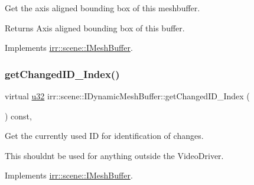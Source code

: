 Get the axis aligned bounding box of this meshbuffer. 

\begin{DoxyReturn}{Returns}
Axis aligned bounding box of this buffer. 
\end{DoxyReturn}


Implements \hyperlink{classirr_1_1scene_1_1IMeshBuffer_ac53fe1096756a40f25dae25911e27c51}{irr\+::scene\+::\+I\+Mesh\+Buffer}.

\mbox{\label{classirr_1_1scene_1_1IDynamicMeshBuffer_a2514a3d0e4865b7b9714fe1f9f58ad51}} 
\subsubsection{\texorpdfstring{get\+Changed\+I\+D\+\_\+\+Index()}{getChangedID\_Index()}}
{\footnotesize\ttfamily virtual \hyperlink{namespaceirr_a0416a53257075833e7002efd0a18e804}{u32} irr\+::scene\+::\+I\+Dynamic\+Mesh\+Buffer\+::get\+Changed\+I\+D\+\_\+\+Index (\begin{DoxyParamCaption}{ }\end{DoxyParamCaption}) const\hspace{0.3cm}{\ttfamily [inline]}, {\ttfamily [virtual]}}



Get the currently used ID for identification of changes. 

This shouldn\textquotesingle{}t be used for anything outside the Video\+Driver. 

Implements \hyperlink{classirr_1_1scene_1_1IMeshBuffer_acc389d76856dfb06c3ba45a92315e6d8}{irr\+::scene\+::\+I\+Mesh\+Buffer}.

\mbox{\label{classirr_1_1scene_1_1IDynamicMeshBuffer_a3480aae22a6701453a19b4c4cbcf2555}} 
